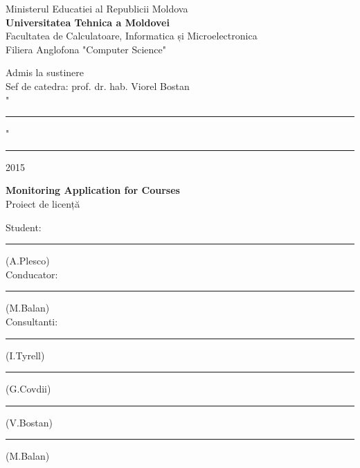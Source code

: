 \begin{titlepage}

\newcommand{\HRule}{\rule{\linewidth}{0.5mm}} %

\center %
 

Ministerul Educatiei al Republicii Moldova\\ %
\textbf{Universitatea Tehnica a Moldovei}\\%
Facultatea de Calculatoare, Informatica și Microelectronica\\
Filiera Anglofona "Computer Science"\\


\vspace{2cm}



\hfill Admis la sustinere\\
\hfill Sef de catedra: prof. dr. hab. Viorel Bostan\\

\vspace{0.4cm}
\hfill "\rule{0.75cm}{0.2mm}" \ \rule{3cm}{0.2mm} 2015
\vspace{3cm}




\begin{center}
\Large \textbf{Monitoring Application for Courses}\\
\vspace{0.6cm}
Proiect de licență
\end{center}
\vspace{1cm}


\hfill Student: \rule{3.9cm}{0.2mm}(A.Plesco)\\
\vspace{0.2cm}
\hfill Conducator: \rule{4cm}{0.2mm}(M.Balan)\\
\vspace{0.2cm}
\hfill Consultanti: \rule{4.2cm}{0.2mm}(I.Tyrell)\\
\vspace{0.2cm}
\hfill \rule{4cm}{0.2mm}(G.Covdii)\\
\vspace{0.2cm}
\hfill \rule{3.9cm}{0.2mm}(V.Bostan)\\
\vspace{0.2cm}
\hfill \rule{4cm}{0.2mm}(M.Balan)\\
\vspace{4cm}




\end{titlepage}
